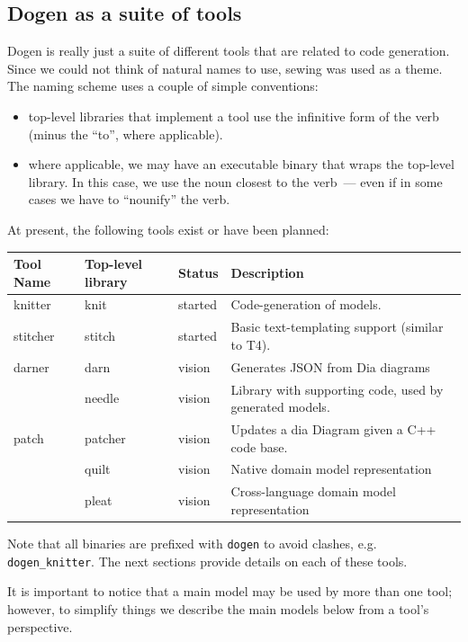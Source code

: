 \documentclass{book}
\begin{document}
\subsection{Dogen as a suite of tools}

Dogen is really just a suite of different tools that are related to
code generation. Since we could not think of natural names to use,
sewing was used as a theme. The naming scheme uses a couple of simple
conventions:

\begin{itemize}
\item top-level libraries that implement a tool use the infinitive
  form of the verb (minus the ``to'', where applicable).
\item where applicable, we may have an executable binary that wraps
  the top-level library. In this case, we use the noun closest to the
  verb~--- even if in some cases we have to ``nounify'' the verb.
\end{itemize}

At present, the following tools exist or have been planned:

\begin{center}
\begin{tabular}{llll}
Tool Name & Top-level library & Status & Description\\
\hline
knitter & knit & started & Code-generation of models.\\
stitcher & stitch & started & Basic text-templating support (similar to T4).\\
darner & darn & vision & Generates JSON from Dia diagrams\\
 & needle & vision & Library with supporting code, used by generated models.\\
patch & patcher & vision & Updates a dia Diagram given a C++ code base.\\
 & quilt & vision & Native domain model representation\\
 & pleat & vision & Cross-language domain model representation\\
\end{tabular}
\end{center}

Note that all binaries are prefixed with \texttt{dogen} to avoid
clashes, e.g. \texttt{dogen\_knitter}. The next sections provide
details on each of these tools.

It is important to notice that a main model may be used by more than
one tool; however, to simplify things we describe the main models
below from a tool's perspective.
\end{document}
